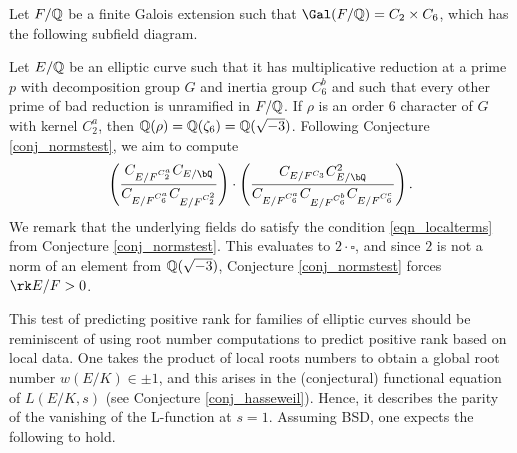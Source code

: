 \begin{example}
    Let $F/\mathbb{Q}$ be a finite Galois extension such that $\Gal(F/\QQ)=C_2\times C_6$, which has the following subfield diagram.
    \begin{figure}[H]
        \centering
    \end{figure}
    Let $E/\mathbb{Q}$ be an elliptic curve such that it has multiplicative reduction at a prime $p$ with decomposition group $G$ and inertia group $C_6^b$ and such that every other prime of bad reduction is unramified in $F/\mathbb{Q}$. If $\rho$ is an order $6$ character of $G$ with kernel $C_2^a$, then $\mathbb{Q}(\rho)=\mathbb{Q}(\zeta_6)=\mathbb{Q}(\sqrt{-3})$. Following Conjecture \ref{conj_normstest}, we aim to compute 
    \begin{equation*}\label{eqn-rel2}
        \left(\frac{C_{E / F^{C_2^a}} C_{E / \bQ} }{C_{E / F^{C_6^a}} C_{E / F^{C_2^2}}}\right) \cdot \left( \frac{C_{E / F^{C_3}} C_{E / \bQ}^2}{C_{E / F^{C_6^a}}C_{E / F^{C_6^b}}  C_{E / F^{C_6^c}} } \right).
    \end{equation*}
    We remark that the underlying fields do satisfy the condition \eqref{eqn_localterms} from Conjecture \ref{conj_normstest}. This evaluates to $2\cdot\square$, and since $2$ is not a norm of an element from $\mathbb{Q}(\sqrt{-3})$, Conjecture \ref{conj_normstest} forces $\rk E/F>0$. 
\end{example}

This test of predicting positive rank for families of elliptic curves should be reminiscent of using root number computations to predict positive rank based on local data. One takes the product of local roots numbers to obtain a global root number $w(E/K)\in{\pm1}$, and this arises in the (conjectural) functional equation of $L(E/K,s)$ (see Conjecture \ref{conj_hasseweil}). Hence, it describes the parity of the vanishing of the L-function at $s=1$. Assuming BSD, one expects the following to hold.

